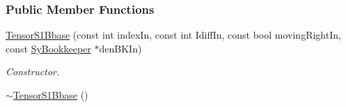 \subsubsection*{Public Member Functions}
\begin{DoxyCompactItemize}
\item 
\hyperlink{classCheMPS2_1_1TensorS1Bbase_ab942dd11c199fac9de678b4f513f920d}{Tensor\-S1\-Bbase} (const int index\-In, const int Idiff\-In, const bool moving\-Right\-In, const \hyperlink{classCheMPS2_1_1SyBookkeeper}{Sy\-Bookkeeper} $\ast$den\-B\-K\-In)
\begin{DoxyCompactList}\small\item\em Constructor. \end{DoxyCompactList}\item 
\hypertarget{classCheMPS2_1_1TensorS1Bbase_a90d0a26c45f2e56caca01938fda67ed5}{\hyperlink{classCheMPS2_1_1TensorS1Bbase_a90d0a26c45f2e56caca01938fda67ed5}{$\sim$\-Tensor\-S1\-Bbase} ()}\label{classCheMPS2_1_1TensorS1Bbase_a90d0a26c45f2e56caca01938fda67ed5}


\end{DoxyCompactItemize}
